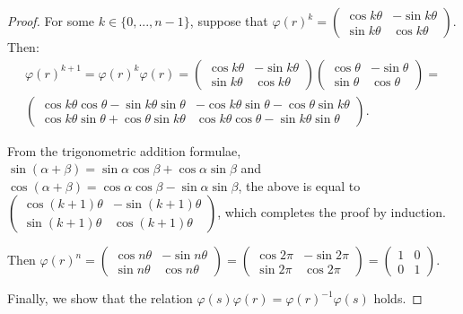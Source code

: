 \documentclass{article}
\begin{document}
\begin{enumerate}[label=(\alph*)]
\begin{proof}
            For some $k \in \{0, ..., n - 1 \}$, suppose that $\varphi(r)^k = \begin{pmatrix}\cos k \theta & -\sin k \theta \\ \sin k \theta & \cos k \theta\end{pmatrix}$. Then:
            \begin{multline*}
                \varphi(r)^{k + 1} = \varphi(r)^k \varphi(r) = \begin{pmatrix}\cos k \theta & -\sin k \theta \\ \sin k \theta & \cos k \theta\end{pmatrix}\begin{pmatrix}\cos \theta & -\sin \theta \\ \sin \theta & \cos \theta\end{pmatrix} = \\
                \begin{pmatrix}\cos k \theta \cos \theta - \sin k \theta \sin \theta & -\cos k \theta \sin \theta - \cos \theta \sin k \theta \\ \cos k \theta \sin \theta + \cos \theta \sin k \theta & \cos k \theta \cos \theta - \sin k \theta \sin \theta\end{pmatrix}.
            \end{multline*}

            From the trigonometric addition formulae, $\sin(\alpha + \beta) = \sin \alpha \cos \beta + \cos \alpha \sin \beta$ and $\cos(\alpha + \beta) = \cos \alpha \cos \beta - \sin \alpha \sin \beta$, the above is equal to $\begin{pmatrix}\cos (k + 1) \theta & -\sin (k + 1) \theta \\ \sin (k + 1) \theta & \cos (k + 1) \theta\end{pmatrix}$, which completes the proof by induction.

            Then $\varphi(r)^n = \begin{pmatrix}\cos n \theta & -\sin n \theta \\ \sin n \theta & \cos n \theta\end{pmatrix} = \begin{pmatrix}\cos 2 \pi & -\sin 2 \pi \\ \sin 2 \pi & \cos 2 \pi\end{pmatrix} = \begin{pmatrix}1 & 0 \\ 0 & 1\end{pmatrix}$.

            Finally, we show that the relation $\varphi(s)\varphi(r) = \varphi(r)^{-1}\varphi(s)$ holds.


\end{proof}
\end{enumerate}
\end{document}
